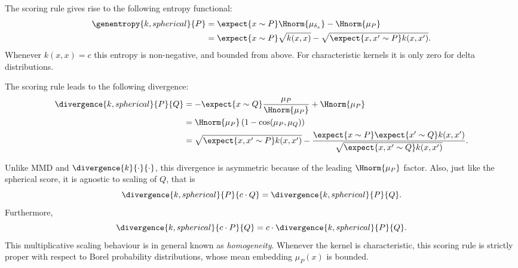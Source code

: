 The scoring rule gives rise to the following entropy functional:
%
\begin{align}
	\genentropy{k,spherical}{P} & = \expect{x\sim P}\Hnorm{\mu_{\delta_x}} - \Hnorm{\mu_P}\\
		& = \expect{x\sim P}\sqrt{k(x,x)} - \sqrt{\expect{x,x'\sim P}k(x,x')}.
\end{align}
%
Whenever $k(x,x)=c$ this entropy is non-negative, and bounded from above. For characteristic kernels it is only zero for delta distributions.

The scoring rule leads to the following divergence:
%
\begin{align}
	\divergence{k,spherical}{P}{Q} &= - \expect{x\sim Q}\frac{\mu_P}{\Hnorm{\mu_P}} + \Hnorm{\mu_P}\\
		&= \Hnorm{\mu_P} \left( 1 - \cos(\mu_P, \mu_Q)\right)\\
		&= \sqrt{\expect{x,x'\sim P}k(x,x')} - \frac{\expect{x\sim P}\expect{x'\sim Q}k(x,x')}{\sqrt{\expect{x,x'\sim Q}k(x,x')}}. \label{eqn:spherical_kernel_divergence}
\end{align}

Unlike MMD and $\divergence{k}{\cdot}{\cdot}$, this divergence is asymmetric because of the leading $\Hnorm{\mu_P}$ factor. Also, just like the spherical score, it is agnostic to scaling of $Q$, that is
%
\begin{equation}
	\divergence{k,spherical}{P}{c\cdot Q} = \divergence{k,spherical}{P}{Q}.\label{eqn:spherical_kernel_homogeneity_Q}
\end{equation}
%
Furthermore,
%
\begin{equation}
	\divergence{k,spherical}{c\cdot P}{Q} = c \cdot \divergence{k,spherical}{P}{Q}.\label{eqn:spherical_kernel_homogeneity_P}
\end{equation}
%
This multiplicative scaling behaviour is in general known as \emph{homogeneity}. Whenever the kernel is characteristic, this scoring rule is strictly proper with respect to Borel probability distributions, whose mean embedding $\mu_P(x)$ is bounded.

